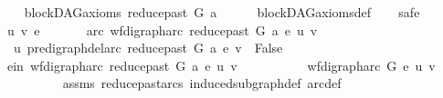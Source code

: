 \begin{isabellebody}
\isamarkupfalse%
\isanewline
\ \ \isamarkupfalse%
\ {\isachardoublequoteopen}blockDAG{\isacharunderscore}{\kern0pt}axioms\ {\isacharparenleft}{\kern0pt}reduce{\isacharunderscore}{\kern0pt}past\ G\ a{\isacharparenright}{\kern0pt}{\isachardoublequoteclose}\isanewline
\ \ \ \ \isamarkupfalse%
\ blockDAG{\isacharunderscore}{\kern0pt}axioms{\isacharunderscore}{\kern0pt}def\isanewline
\ \ \isamarkupfalse%
\ safe\isanewline
\ \ \ \ \isamarkupfalse%
\ u\ v\ e\ \isanewline
\ \ \ \ \isamarkupfalse%
\ arc{\isacharcolon}{\kern0pt}\ {\isachardoublequoteopen}wf{\isacharunderscore}{\kern0pt}digraph{\isachardot}{\kern0pt}arc\ {\isacharparenleft}{\kern0pt}reduce{\isacharunderscore}{\kern0pt}past\ G\ a{\isacharparenright}{\kern0pt}\ e\ {\isacharparenleft}{\kern0pt}u{\isacharcomma}{\kern0pt}\ v{\isacharparenright}{\kern0pt}{\isachardoublequoteclose}\isanewline
\ \ \ \ \isamarkupfalse%
\ \isamarkupfalse%
\ {\isachardoublequoteopen}\ u\ {\isasymrightarrow}\isactrlsup {\isacharplus}{\kern0pt}\isactrlbsub pre{\isacharunderscore}{\kern0pt}digraph{\isachardot}{\kern0pt}del{\isacharunderscore}{\kern0pt}arc\ {\isacharparenleft}{\kern0pt}reduce{\isacharunderscore}{\kern0pt}past\ G\ a{\isacharparenright}{\kern0pt}\ e\isactrlesub \ v\ {\isasymLongrightarrow}\ False\ {\isachardoublequoteclose}\isanewline
\ \ \ \ \isamarkupfalse%
\ {\isacharminus}{\kern0pt}\isanewline
\ \ \ \ \ \ \isamarkupfalse%
\ e{\isacharunderscore}{\kern0pt}in{\isacharcolon}{\kern0pt}\ {\isachardoublequoteopen}{\isacharparenleft}{\kern0pt}wf{\isacharunderscore}{\kern0pt}digraph{\isachardot}{\kern0pt}arc\ {\isacharparenleft}{\kern0pt}reduce{\isacharunderscore}{\kern0pt}past\ G\ a{\isacharparenright}{\kern0pt}\ e\ {\isacharparenleft}{\kern0pt}u{\isacharcomma}{\kern0pt}\ v{\isacharparenright}{\kern0pt}{\isacharparenright}{\kern0pt}{\isachardoublequoteclose}\ \isanewline
\ \ \ \ \ \ \isamarkupfalse%
\ \isamarkupfalse%
\ {\isachardoublequoteopen}{\isacharparenleft}{\kern0pt}wf{\isacharunderscore}{\kern0pt}digraph{\isachardot}{\kern0pt}arc\ G\ e\ {\isacharparenleft}{\kern0pt}u{\isacharcomma}{\kern0pt}\ v{\isacharparenright}{\kern0pt}{\isacharparenright}{\kern0pt}{\isachardoublequoteclose}\isanewline
\ \ \ \ \ \ \ \ \isamarkupfalse%
\ assms\ reduce{\isacharunderscore}{\kern0pt}past{\isacharunderscore}{\kern0pt}arcs{}\ induced{\isacharunderscore}{\kern0pt}subgraph{\isacharunderscore}{\kern0pt}def\ arc{\isacharunderscore}{\kern0pt}def\ \isanewline

\end{isabellebody}

